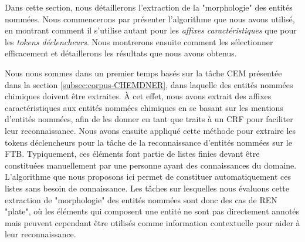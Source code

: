 \documentclass[12pt,a4paper,times,twoside,openright]{report}
\begin{document}
Dans cette section, nous détaillerons l'extraction de la "morphologie" des entités nommées. Nous commencerons par présenter l'algorithme que nous avons utilisé, en montrant comment il s'utilise autant pour les \emph{affixes caractéristiques} que pour les \emph{tokens déclencheurs}. Nous montrerons ensuite comment les sélectionner efficacement et détaillerons les résultats que nous avons obtenus.

Nous nous sommes dans un premier temps basés sur la tâche CEM présentée dans la section \ref{subsec:corpus-CHEMDNER}, dans laquelle des entités nommées chimiques doivent être extraites. À cet effet, nous avons extrait des affixes caractéristiques aux entités nommées chimiques en se basant sur les mentions d'entités nommées, afin de les donner en tant que traits à un CRF pour faciliter leur reconnaissance. Nous avons ensuite appliqué cette méthode pour extraire les tokens déclencheurs pour la tâche de la reconnaissance d'entités nommées sur le FTB. Typiquement, ces éléments font partie de listes finies devant être constituées manuellement par une personne ayant des connaissances du domaine. L'algorithme que nous proposons ici permet de constituer automatiquement ces listes sans besoin de connaissance. Les tâches sur lesquelles nous évaluons cette extraction de "morphologie" des entités nommées sont donc des cas de REN "plate", où les éléments qui composent une entité ne sont pas directement annotés mais peuvent cependant être utilisés comme information contextuelle pour aider à leur reconnaissance.
\end{document}
